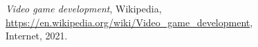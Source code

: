 
\begin{thebibliography}{x}

	\emph{Video game development}, Wikipedia, \\
	\url{https://en.wikipedia.org/wiki/Video_game_development}, \\
	Internet, 2021.



\end{thebibliography}
